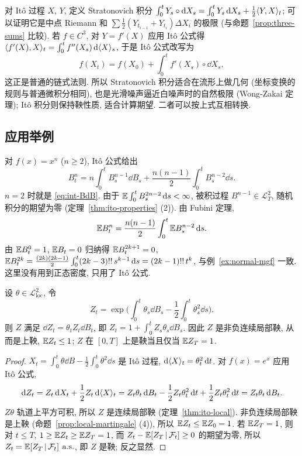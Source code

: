 \begin{remark}[Stratonovich 积分]
对 It\^o 过程 $X$, $Y$, 定义 Stratonovich 积分 $\int_0^tY_s\circ\mathop{}\!\mathrm{d} X_s=\int_0^tY_s\mathop{}\!\mathrm{d} X_s+\frac{1}{2}\langle Y,X\rangle_t$; 可以证明它是中点 Riemann 和 $\sum\frac{1}{2}(Y_{t_{i-1}}+Y_{t_i})\Delta X_i$ 的极限 (与命题~\ref{prop:three-sums} 比较). 若 $f\in C^3$, 对 $Y=f'(X)$ 应用 It\^o 公式得 $\langle f'(X),X\rangle_t=\int_0^tf''(X_s)\mathop{}\!\mathrm{d}\langle X\rangle_s$, 于是 It\^o 公式改写为
\[
f(X_t)=f(X_0)+\int_0^tf'(X_s)\circ\dd X_s,
\]
这正是普通的链式法则. 所以 Stratonovich 积分适合在流形上做几何 (坐标变换的规则与普通微积分相同), 也是光滑噪声逼近白噪声时的自然极限 (Wong-Zakai 定理); It\^o 积分则保持鞅性质, 适合计算期望. 二者可以按上式互相转换.
\end{remark}

\subsection{应用举例}

\begin{example}[多项式与矩]\label{ex:ito-moments}
对 $f(x)=x^n$ ($n\ge2$), It\^o 公式给出
\[
B_t^n=n\int_0^tB_s^{n-1}\dd B_s+\frac{n(n-1)}{2}\int_0^tB_s^{n-2}\dd s.
\]
$n=2$ 时就是 \eqref{eq:int-BdB}. 由于 $\mathbb{E}\int_0^tB_s^{2n-2}\mathop{}\!\mathrm{d} s<\infty$, 被积过程 $B^{n-1}\in\mathscr{L}^2_T$, 随机积分的期望为零 (定理~\ref{thm:ito-properties} (2)). 由 Fubini 定理,
\[
\mathbb{E} B_t^n=\frac{n(n-1)}{2}\int_0^t\mathbb{E} B_s^{n-2}\mathop{}\!\mathrm{d} s.
\]
由 $\mathbb{E} B_t^0=1$, $\mathbb{E} B_t=0$ 归纳得 $\mathbb{E} B_t^{2k+1}=0$, $\mathbb{E} B_t^{2k}=\frac{(2k)(2k-1)}{2}\int_0^t(2k-3)!!\,s^{k-1}\mathop{}\!\mathrm{d} s=(2k-1)!!\,t^k$, 与例~\ref{ex:normal-mgf} 一致. 这里没有用到正态密度, 只用了 It\^o 公式.
\end{example}

\begin{proposition}[随机指数]\label{prop:stochastic-exp}
设 $\theta\in\mathscr{L}^2_{\mathrm{loc}}$, 令
\[
Z_t=\exp\Big(\int_0^t\theta_s\dd B_s-\frac{1}{2}\int_0^t\theta_s^2\dd s\Big).
\]
则 $Z$ 满足 $\dd Z_t=\theta_tZ_t\dd B_t$, 即 $Z_t=1+\int_0^tZ_s\theta_s\dd B_s$. 因此 $Z$ 是非负连续局部鞅, 从而是上鞅, $\mathbb{E} Z_t\le1$; $Z$ 在 $[0,T]$ 上是鞅当且仅当 $\mathbb{E} Z_T=1$.
\end{proposition}

\begin{proof}
$X_t=\int_0^t\theta\dd B-\frac{1}{2}\int_0^t\theta^2\dd s$ 是 It\^o 过程, $\mathop{}\!\mathrm{d}\langle X\rangle_t=\theta_t^2\mathop{}\!\mathrm{d} t$. 对 $f(x)=e^x$ 应用 It\^o 公式,
\[
\mathop{}\!\mathrm{d} Z_t=Z_t\mathop{}\!\mathrm{d} X_t+\frac{1}{2}Z_t\mathop{}\!\mathrm{d}\langle X\rangle_t=Z_t\theta_t\mathop{}\!\mathrm{d} B_t-\frac{1}{2}Z_t\theta_t^2\mathop{}\!\mathrm{d} t+\frac{1}{2}Z_t\theta_t^2\mathop{}\!\mathrm{d} t=Z_t\theta_t\mathop{}\!\mathrm{d} B_t.
\]
$Z\theta$ 轨道上平方可积, 所以 $Z$ 是连续局部鞅 (定理~\ref{thm:ito-local}). 非负连续局部鞅是上鞅 (命题~\ref{prop:local-martingale} (4)), 所以 $\mathbb{E} Z_t\le\mathbb{E} Z_0=1$. 若 $\mathbb{E} Z_T=1$, 则对 $t\le T$, $1\ge\mathbb{E} Z_t\ge\mathbb{E} Z_T=1$, 而 $Z_t-\mathbb{E}[Z_T\,|\,\mathcal{F}_t]\ge0$ 的期望为零, 所以 $Z_t=\mathbb{E}[Z_T\,|\,\mathcal{F}_t]$ $\text{a.s.}$, 即 $Z$ 是鞅; 反之显然.
\end{proof}

